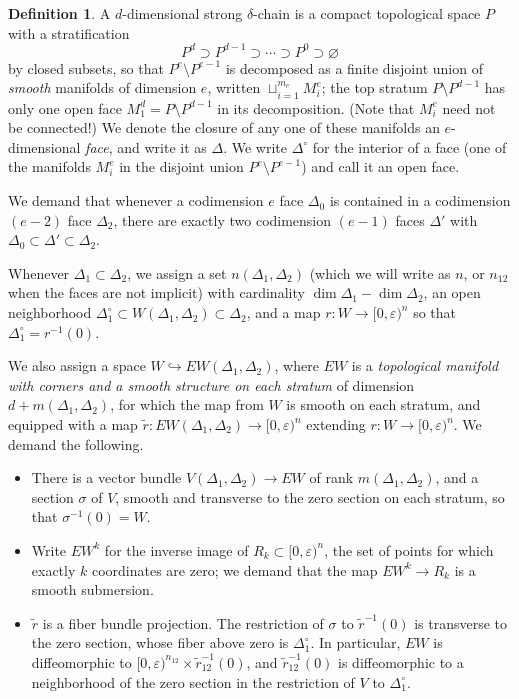 \documentclass{memo-l}
\theoremstyle{definition}
\newtheorem{definition}[theorem]{Definition}
\theoremstyle{remark}
\numberwithin{section}{chapter}
\numberwithin{equation}{chapter}
\begin{document}
\begin{definition}A $d$-dimensional strong $\delta$-chain is a compact topological space $P$ with a stratification $$P^d \supset P^{d-1} \supset \cdots \supset P^0 \supset \varnothing$$ by closed subsets, so that $P^e \setminus P^{e-1}$ is decomposed as a finite disjoint union of \emph{smooth} manifolds of dimension $e$, written $\sqcup_{i=1}^{m_e} M_i^e$; the top stratum $P \setminus P^{d-1}$ has only one open face $M_1^d = P \setminus P^{d-1}$ in its decomposition. (Note that $M_i^e$ need not be connected!) We denote the closure of any one of these manifolds an $e$-dimensional \emph{face}, and write it as $\Delta$. We write $\Delta^\circ$ for the interior of a face (one of the manifolds $M_i^e$ in the disjoint union $P^e \setminus P^{e-1}$) and call it an \textup{open face}.

We demand that whenever a codimension $e$ face $\Delta_0$ is contained in a codimension $(e-2)$ face $\Delta_2$, there are exactly two codimension $(e-1)$ faces $\Delta'$ with $\Delta_0 \subset \Delta' \subset \Delta_2.$

Whenever $\Delta_1 \subset \Delta_2$, we assign a set $n(\Delta_1, \Delta_2)$ (which we will write as $n$, or $n_{12}$ when the faces are not implicit) with cardinality $\dim \Delta_1 - \dim \Delta_2$, an open neighborhood $\Delta_1^\circ \subset W(\Delta_1, \Delta_2) \subset \Delta_2$, and a map $r: W \to [0,\varepsilon)^n$ so that $\Delta_1^\circ = r^{-1}(0)$.

We also assign a space $W \hookrightarrow EW(\Delta_1, \Delta_2)$, where $EW$ is a \emph{topological manifold with corners and a smooth structure on each stratum} of dimension $d+m(\Delta_1, \Delta_2)$, for which the map from $W$ is smooth on each stratum, and equipped with a map $\tilde r: EW(\Delta_1, \Delta_2) \to [0,\varepsilon)^n$ extending $r: W \to [0,\varepsilon)^n$. We demand the following.
\begin{itemize}
\item There is a vector bundle $V(\Delta_1, \Delta_2) \to EW$ of rank $m(\Delta_1, \Delta_2)$, and a section $\sigma$ of $V$, smooth and transverse to the zero section on each stratum, so that $\sigma^{-1}(0) = W$.
\item Write $EW^k$ for the inverse image of $R_k \subset [0,\varepsilon)^n$, the set of points for which exactly $k$ coordinates are zero; we demand that the map $EW^k \to R_k$ is a smooth submersion.
\item $\tilde r$ is a fiber bundle projection. The restriction of $\sigma$ to $\tilde r^{-1}(0)$ is transverse to the zero section, whose fiber above zero is $\Delta_1^\circ$. In particular, $EW$ is diffeomorphic to $[0,\varepsilon)^{n_{12}} \times \tilde r_{12}^{-1}(0)$, and $\tilde r_{12}^{-1}(0)$ is diffeomorphic to a neighborhood of the zero section in the restriction of $V$ to $\Delta_1^\circ$.
\end{itemize}


\end{definition}
\end{document}
